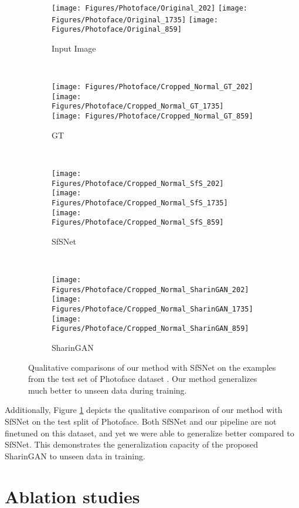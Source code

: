 \documentclass[10pt,twocolumn,letterpaper]{article}
\begin{document}
\begin{figure}[!h]
    \begin{subfigure}{0.25\linewidth}{
        \texttt{[image: Figures/Photoface/Original\_202]}
        \texttt{[image: Figures/Photoface/Original\_1735]}
        \texttt{[image: Figures/Photoface/Original\_859]}}
        \caption{Input Image}
    \end{subfigure}~
    \begin{subfigure}{0.25\linewidth}{
        \texttt{[image: Figures/Photoface/Cropped\_Normal\_GT\_202]}
        \texttt{[image: Figures/Photoface/Cropped\_Normal\_GT\_1735]}
        \texttt{[image: Figures/Photoface/Cropped\_Normal\_GT\_859]}}
        \caption{GT}
    \end{subfigure}~
    \begin{subfigure}{0.25\linewidth}{
        \texttt{[image: Figures/Photoface/Cropped\_Normal\_SfS\_202]}
        \texttt{[image: Figures/Photoface/Cropped\_Normal\_SfS\_1735]}
        \texttt{[image: Figures/Photoface/Cropped\_Normal\_SfS\_859]}}
        \caption{SfSNet\cite{SfSNet}}
    \end{subfigure}~
    \begin{subfigure}{0.25\linewidth}{
        \texttt{[image: Figures/Photoface/Cropped\_Normal\_SharinGAN\_202]}
        \texttt{[image: Figures/Photoface/Cropped\_Normal\_SharinGAN\_1735]}
        \texttt{[image: Figures/Photoface/Cropped\_Normal\_SharinGAN\_859]}}
        \caption{SharinGAN}
    \end{subfigure}\caption{Qualitative comparisons of our method with SfSNet on the examples from the test set of Photoface dataset \cite{Photoface}. Our method generalizes much better to unseen data during training. }
\label{fig:FNE_SharinGAN_photoface}
\end{figure}
Additionally, Figure \ref{fig:FNE_SharinGAN_photoface}  depicts the qualitative comparison of our method with SfSNet on the test split of Photoface.
Both SfSNet and our pipeline are not finetuned on this dataset, and yet we were able to generalize better compared to SfSNet. 
This demonstrates the generalization capacity of the proposed SharinGAN to unseen data in training. 








\section{Ablation studies}
\end{document}
